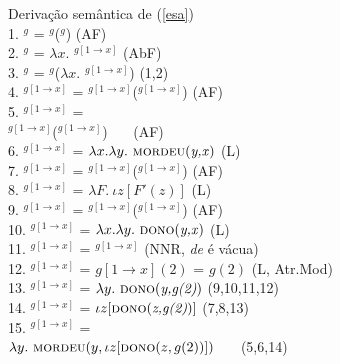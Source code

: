 \begin{exe}
	\ex Derivação semântica de (\ref{esa})\\
	1. $^{g}$ = $^{g}$($^{g}$) \hfill (AF)\\
	2. $^{g}$ = $\lambda x.$ $^{g[1 \rightarrow x]}$ \hfill (AbF)\\
	3. $^{g}$ = $^{g}$($\lambda x.$ $^{g[1 \rightarrow x]}$) \hfill (1,2)\\
	4. $^{g[1 \rightarrow x]}$ = $^{g[1 \rightarrow x]}$($^{g[1 \rightarrow x]}$) \hfill (AF)\\
	5. $^{g[1 \rightarrow x]}$ = \\
	\hspace*{\fill} $^{g[1 \rightarrow x]}$($^{g[1 \rightarrow x]}$) \ \ \ (AF) \\
	6. $^{g[1 \rightarrow x]}$ = $\lambda x.\lambda y.\ \predica{mordeu}{y,x}$ \hfill (L)\\
	7. $^{g[1 \rightarrow x]}$ = $^{g[1 \rightarrow x]}$($^{g[1 \rightarrow x]}$) \hfill (AF)\\
	8. $^{g[1 \rightarrow x]}$ = $\lambda F.\ \iota z[F'(z)]$ \hfill (L)\\
	9. $^{g[1 \rightarrow x]}$ = $^{g[1 \rightarrow x]}$($^{g[1 \rightarrow x]}$) \hfill (AF)\\
	10. $^{g[1 \rightarrow x]}$ = $\lambda x.\lambda y.\ \predica{dono}{y,x}$ \hfill (L)\\
	11. $^{g[1 \rightarrow x]}$ = $^{g[1 \rightarrow x]}$ \hfill (NNR, \textit{de} é vácua)\\
	12. $^{g[1 \rightarrow x]}$ = $g[1 \rightarrow x](2)$ = $g(2)$ \hfill (L, Atr.Mod)\\
	13. $^{g[1 \rightarrow x]}$ = $\lambda y.\ \text{\textsc{dono}(\textit{y,g(2)})}$ \hfill (9,10,11,12)\\
	14. $^{g[1 \rightarrow x]}$ = $\iota z[\text{\textsc{dono}(\textit{z,g(2)})}]$ \hfill (7,8,13)\\
	15. $^{g[1 \rightarrow x]}$ = \\
	\hspace*{\fill} $\lambda y.\ \textsc{mordeu}(y,\iota z[\textsc{dono}(z,g(2))])$ \ \ \  (5,6,14)\\

\end{exe}
